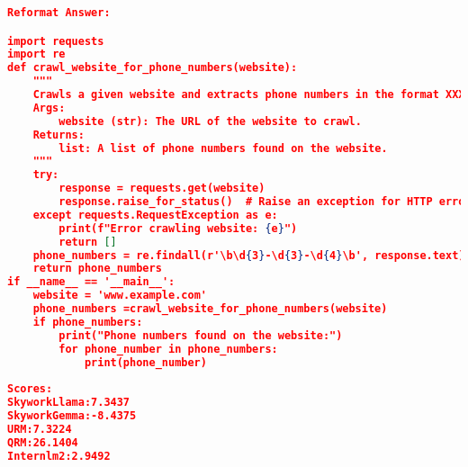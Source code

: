\begin{lstlisting}[language=json,numbers=none]
Reformat Answer:

import requests
import re
def crawl_website_for_phone_numbers(website):
    """
    Crawls a given website and extracts phone numbers in the format XXX-XXX-XXXX.
    Args:
        website (str): The URL of the website to crawl.
    Returns:
        list: A list of phone numbers found on the website.
    """
    try:
        response = requests.get(website)
        response.raise_for_status()  # Raise an exception for HTTP errors
    except requests.RequestException as e:
        print(f"Error crawling website: {e}")
        return []
    phone_numbers = re.findall(r'\b\d{3}-\d{3}-\d{4}\b', response.text)
    return phone_numbers
if __name__ == '__main__':
    website = 'www.example.com'
    phone_numbers =crawl_website_for_phone_numbers(website)
    if phone_numbers:
        print("Phone numbers found on the website:")
        for phone_number in phone_numbers:
            print(phone_number)
        
Scores:
SkyworkLlama:7.3437
SkyworkGemma:-8.4375
URM:7.3224
QRM:26.1404
Internlm2:2.9492
\end{lstlisting}